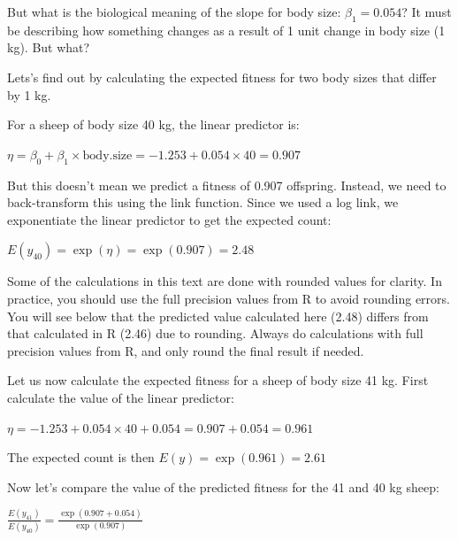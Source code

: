 \documentclass[
  letterpaper,
  8pt,
  a4paper]{book}
\begin{document}
But what is the biological meaning of the slope for body size:
\(\beta_1 = 0.054\)? It must be describing how something changes as a
result of 1 unit change in body size (1 kg). But what?

Lets's find out by calculating the expected fitness for two body sizes
that differ by 1 kg.

For a sheep of body size 40 kg, the linear predictor is:

\(\eta = \beta_0 + \beta_1 \times \text{body.size} = -1.253 + 0.054 \times 40 = 0.907\)

But this doesn't mean we predict a fitness of 0.907 offspring. Instead,
we need to back-transform this using the link function. Since we used a
log link, we exponentiate the linear predictor to get the expected
count:

\(E(y_{40}) = \exp(\eta) = \exp(0.907) = 2.48\)

\begin{tcolorbox}[enhanced jigsaw, arc=.35mm, bottomrule=.15mm, bottomtitle=1mm, breakable, colback=white, colbacktitle=quarto-callout-caution-color!10!white, colframe=quarto-callout-caution-color-frame, coltitle=black, left=2mm, leftrule=.75mm, opacityback=0, opacitybacktitle=0.6, rightrule=.15mm, title=\textcolor{quarto-callout-caution-color}{\faFire}\hspace{0.5em}{Caution}, titlerule=0mm, toprule=.15mm, toptitle=1mm]

Some of the calculations in this text are done with rounded values for
clarity. In practice, you should use the full precision values from R to
avoid rounding errors. You will see below that the predicted value
calculated here (2.48) differs from that calculated in R (2.46) due to
rounding. Always do calculations with full precision values from R, and
only round the final result if needed.

\end{tcolorbox}

Let us now calculate the expected fitness for a sheep of body size 41
kg. First calculate the value of the linear predictor:

\(\eta = -1.253 + 0.054 \times 40 + 0.054 = 0.907 + 0.054 = 0.961\)

The expected count is then \(E(y) = \exp(0.961) = 2.61\)

Now let's compare the value of the predicted fitness for the 41 and 40
kg sheep:

\(\frac{E(y_{41})}{E(y_{40})} = \frac{\exp(0.907 + 0.054)}{\exp(0.907)}\)
\end{document}
